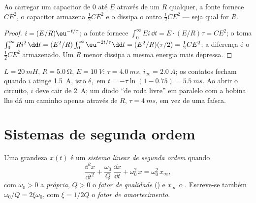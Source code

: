 \begin{proposition}\label{prop:b1:transient-regimes:rcenergy}
Ao carregar um capacitor de $0$ até $E$ através de um  $R$ qualquer, a
fonte fornece $CE^2$, o capacitor armazena $\tfrac12 CE^2$ e o
 dissipa o outro $\tfrac12 CE^2$ --- seja qual for $R$.
\end{proposition}

\begin{proof}
$i = (E/R)\eu^{-t/\tau}$; a fonte fornece $\int_0^\infty Ei\,\dd t
= E \cdot (E/R)\tau = CE^2$; o  toma $\int_0^\infty Ri^2\,\dd t
= (E^2/R)\int_0^\infty \eu^{-2t/\tau}\dd t = (E^2/R)(\tau/2) = \tfrac12 CE^2$;
a diferença é o $\tfrac12 CE^2$ armazenado. Um $R$ menor dissipa
a mesma energia mais depressa.
\end{proof}

\begin{example}\label{ex:b1:transient-regimes:relay}
$L = \qty{20}{mH}$, $R = \qty{5.0}{\ohm}$, $E = \qty{10}{V}$: $\tau =
\qty{4.0}{ms}$, $i_\infty = \qty{2.0}{A}$; os contatos fecham quando
$i$ atinge \qty{1.5}{A}, isto é,\ em $t = -\tau\ln(1 - 0.75) =
\qty{5.5}{ms}$. Ao abrir o circuito, $i$ deve cair de \qty{2}{A}; um
diodo ``de roda livre'' em paralelo com a bobina lhe dá um caminho apenas
através de $R$, $\tau = \qty{4}{ms}$, em vez de uma faísca.
\end{example}

\section{Sistemas de segunda ordem}

\begin{definition}\label{def:b1:transient-regimes:secondorder}
Uma grandeza $x(t)$ é um \emph{sistema linear de segunda ordem} quando
\[
\frac{\dd^2 x}{\dd t^2} + \frac{\omega_0}{Q}\,\frac{\dd x}{\dd t} + \omega_0^2\,x
= \omega_0^2\,x_\infty ,
\]
com $\omega_0 > 0$ a \emph{ própria}, $Q > 0$ o
\emph{fator de qualidade} () e $x_\infty$ o .
Escreve-se também $\omega_0/Q = 2\xi\omega_0$, com $\xi = 1/2Q$ o
\emph{fator de amortecimento}.
\end{definition}

